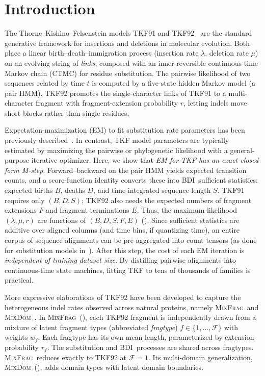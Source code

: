 \documentclass[11pt]{article}
\newcommand{\MixFrag}{\textsc{MixFrag}}
\newcommand{\MixDom}{\textsc{MixDom}}
\newcommand{\BDI}{\textsc{BDI}}
\newcommand{\ins}{\lambda}
\newcommand{\del}{\mu}
\newcommand{\ext}{r}
\begin{document}
\newpage
\section{Introduction}
\label{sec:intro}

The Thorne--Kishino--Felsenstein models TKF91 and
TKF92~\citep{ThorneEtAl91,ThorneEtAl92} are the standard generative
framework for insertions and deletions in molecular evolution. Both
place a linear birth--death--immigration process (insertion rate $\ins$,
deletion rate $\del$) on an evolving string of \emph{links}, composed 
with an inner reversible continuous-time Markov chain
(CTMC) for residue substitution. The pairwise likelihood of two
sequences related by time $t$ is computed by a five-state hidden Markov
model (a pair HMM). TKF92 promotes the single-character links of
TKF91 to a multi-character fragment with fragment-extension
probability $\ext$, letting indels move short blocks rather than single
residues.

Expectation-maximization (EM) to fit substitution rate parameters has been previously
described~\citep{HolmesRubin2002,HobolthJensen2005,HobolthJensen2011}.
In contrast, TKF model parameters are typically estimated by maximizing
the pairwise or phylogenetic likelihood with a general-purpose iterative
optimizer. Here, we show that \emph{EM for TKF has an 
exact closed-form M-step}. Forward--backward on the pair HMM yields 
expected transition counts, and a score-function identity converts these
into \BDI\ sufficient statistics: expected births $B$, deaths $D$, and
time-integrated sequence length $S$. TKF91 requires only $(B,D,S)$; 
TKF92 also needs the expected numbers of fragment extensions 
$F$ and fragment terminations $E$. Thus, the maximum-likelihood
$(\ins,\del,\ext)$ are functions of $(B,D,S,F,E)$
().
Since sufficient statistics are additive over aligned columns (and time bins, if quantizing time), 
an entire corpus of sequence alignments can be pre-aggregated into count tensors 
(as done for substitution models in~\citep{Prillo2022CherryML}). 
After this step, the cost of each EM iteration is 
\emph{independent of training dataset size}. By distilling pairwise 
alignments into continuous-time state machines, fitting TKF to tens 
of thousands of families is practical.

More expressive elaborations of TKF92 have been developed to capture 
the heterogeneous indel rates observed across natural proteins, 
namely \MixFrag\ and \MixDom~\citep{LargeHolmes2026}.
In \MixFrag\ (), each TKF92 fragment is independently 
drawn from a mixture of latent fragment types (abbreviated \emph{fragtype})
$f\in\{1,\dots,\mathcal{F}\}$ with weights $w_f$. Each fragtype has
its own mean length, parameterized by extension probability $r_f$.
The substitution and \BDI\ processes are shared across fragtypes. 
\MixFrag\ reduces exactly to TKF92 at $\mathcal{F}{=}1$. 
Its multi-domain generalization, \MixDom\ (), 
adds domain types with latent domain boundaries. 
\end{document}
